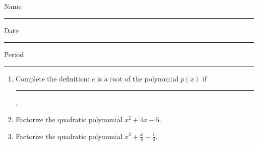 \documentclass[10pt]{article}
\title{}
\date{}
\begin{document}
\noindent
{\large
Name \rule{16em}{.5pt} Date \rule{8em}{.5pt} Period \rule{2em}{.5pt}
}
\vspace{1em}

\begin{enumerate}
    \item Complete the definition: $c$ is a root of the polynomial $p(x)$ if \rule{10em}{0.5pt} .
    \item Factorize the quadratic polynomial \(x^2 + 4x - 5\).
    \item Factorize the quadratic polynomial \(\displaystyle x^2 + \frac{x}{6}- \frac{1}{3}\).
\end{enumerate}
\end{document}
